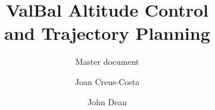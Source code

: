 \documentclass[11pt]{scrartcl} %
\title{\bfseries ValBal Altitude Control\\ and Trajectory Planning}
\subtitle{\Large Master document} %
\author{Joan Creus-Costa\and John Dean}
\begin{document}
\maketitle

\def\States{\mathcal{S}}
\def\Altitudes{\mathcal{H}}
\def\Velocities{\mathcal{V}}
\def\Lifts{\mathcal{L}}

\newcommand{\R}{\mathbb{R}}
\newcommand*{\vertbar}{\rule[-1ex]{0.5pt}{2.5ex}}
\newcommand*{\horzbar}{\rule[.5ex]{2.5ex}{0.5pt}}
\newcommand{\probs}[3]{\paragraph{Problem #1} \textit{#2}
\begin{description}[labelwidth=.7cm,labelindent=0cm,leftmargin=0.9cm,align=left]
#3
\end{description}
}
\newcommand{\prob}[3]{\paragraph{Problem #1} \textit{#2}{#3}}
\newcommand{\prt}[1]{\subsection*{(#1)}}
\newcommand{\n}[1]{\mathrm{#1}}
\newcommand{\nb}[1]{\mathrm{\textbf{#1}}}
\newcommand{\mx}[2]{\left[ \begin{array}{#1} #2 \end{array} \right]}
\newcommand{\ig}[2]{\begin{center}\texttt{[image: \#2]}\end{center}}
\newcommand{\ls}[1]{\begin{lstlisting} #1 \end{lstlisting}} 
\newcommand{\conv}[1]{\mathrm{\textbf{conv}}\{ #1 \}}
\newcommand{\headfoot}[3]{
\pagestyle{fancy}
\lhead{#1}
\chead{#2}
\rhead{#3}
\lfoot{}
\cfoot{\thepage}
\rfoot{}
}

\newcommand{\ones}{\mathbf 1}
\newcommand{\reals}{{\mbox{\bf R}}}
\newcommand{\integers}{{\mbox{\bf Z}}}
\newcommand{\symm}{{\mbox{\bf S}}}  %

\newcommand{\nullspace}{{\mathcal N}}
\newcommand{\range}{{\mathcal R}}
\newcommand{\Rank}{\mathop{\bf Rank}}
\newcommand{\Tr}{\mathop{\bf Tr}}
\newcommand{\diag}{\mathop{\bf diag}}
\newcommand{\card}{\mathop{\bf card}}
\newcommand{\rank}{\mathop{\bf rank}}
\newcommand{\prox}{\mathbf{prox}}

\newcommand{\Expect}{\mathop{\bf E{}}}
\newcommand{\Prob}{\mathop{\bf Prob}}
\newcommand{\Co}{{\mathop {\bf Co}}} %
\newcommand{\dist}{\mathop{\bf dist{}}}
\newcommand{\argmin}{\mathop{\rm argmin}}
\newcommand{\argmax}{\mathop{\rm argmax}}
\newcommand{\epi}{\mathop{\bf epi}} %
\newcommand{\Vol}{\mathop{\bf vol}}
\newcommand{\dom}{\mathop{\bf dom}} %
\newcommand{\intr}{\mathop{\bf int}}
\newcommand{\sign}{\mathop{\bf sign}}
\end{document}
